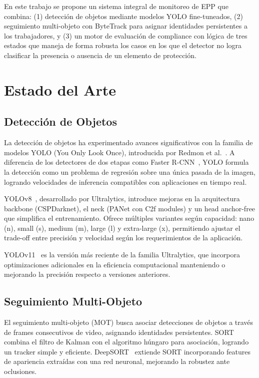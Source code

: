 \documentclass[conference, 10pt]{IEEEtran}
\begin{document}
En este trabajo se propone un sistema integral de monitoreo de EPP que combina: (1) detección de objetos mediante modelos YOLO fine-tuneados, (2) seguimiento multi-objeto con ByteTrack para asignar identidades persistentes a los trabajadores, y (3) un motor de evaluación de compliance con lógica de tres estados que maneja de forma robusta los casos en los que el detector no logra clasificar la presencia o ausencia de un elemento de protección.

\section{Estado del Arte}

\subsection{Detección de Objetos}

La detección de objetos ha experimentado avances significativos con la familia de modelos YOLO (You Only Look Once), introducida por Redmon et al.~\cite{redmon2016yolo}. A diferencia de los detectores de dos etapas como Faster R-CNN~\cite{ren2015faster}, YOLO formula la detección como un problema de regresión sobre una única pasada de la imagen, logrando velocidades de inferencia compatibles con aplicaciones en tiempo real.

YOLOv8~\cite{jocher2023yolov8}, desarrollado por Ultralytics, introduce mejoras en la arquitectura backbone (CSPDarknet), el neck (PANet con C2f modules) y un head anchor-free que simplifica el entrenamiento. Ofrece múltiples variantes según capacidad: nano (n), small (s), medium (m), large (l) y extra-large (x), permitiendo ajustar el trade-off entre precisión y velocidad según los requerimientos de la aplicación.

YOLOv11~\cite{jocher2024yolov11} es la versión más reciente de la familia Ultralytics, que incorpora optimizaciones adicionales en la eficiencia computacional manteniendo o mejorando la precisión respecto a versiones anteriores.

\subsection{Seguimiento Multi-Objeto}

El seguimiento multi-objeto (MOT) busca asociar detecciones de objetos a través de frames consecutivos de video, asignando identidades persistentes. SORT~\cite{bewley2016sort} combina el filtro de Kalman con el algoritmo húngaro para asociación, logrando un tracker simple y eficiente. DeepSORT~\cite{wojke2017deep} extiende SORT incorporando features de apariencia extraídas con una red neuronal, mejorando la robustez ante oclusiones.
\end{document}
